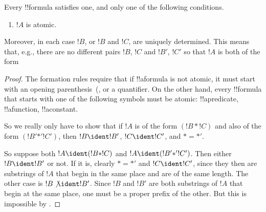 \documentclass[../../../include/open-logic-section]{subfiles}
\begin{document}
\begin{prop}
Every !!{formula} satisfies one, and only one of the following conditions.
\begin{enumerate}
\item $!A$ is atomic.







\end{enumerate}
Moreover, in each case $!B$, or $!B$ and $!C$, are uniquely
determined.  This means that, e.g., there are no different pairs $!B$,
$!C$ and $!B'$, $!C'$ so that $!A$ is both of the form 
\end{prop}

\begin{proof}
The formation rules require that if !!a{formula} is not atomic, it
must start with an opening parenthesis~(, 
or a quantifier. On the other hand, every !!{formula} that starts with
one of the following symbols must be atomic: !!a{predicate}, !!a{function}, !!a{constant}.

So we really only have to show that if $!A$ is of the form $(!B \ast
!C)$ and also of the form $(!B' \mathbin{\ast'} !C')$, then $!B \ident
!B'$, $!C \ident !C'$, and $\ast = {\ast'}$.

So suppose both $!A \ident (!B \ast !C)$ and $!A \ident (!B'
\mathbin{\ast'} !C')$.  Then either $!B \ident !B'$ or not.  If it is,
clearly $\ast = {\ast'}$ and $!C \ident !C'$, since they then are
substrings of $!A$ that begin in the same place and are of the same
length.  The other case is $!B \not\ident !B'$.  Since $!B$ and
$!B'$ are both substrings of $!A$ that begin at the same place, one
must be a proper prefix of the other.  But this is impossible by
.
\end{proof}
\end{document}
